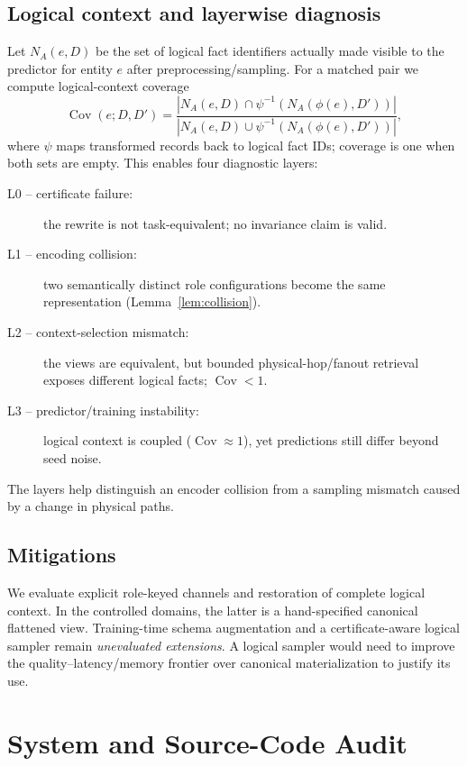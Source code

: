 \documentclass[runningheads]{llncs}
\newcommand{\Cov}{\operatorname{Cov}}
\begin{document}
\subsection{Logical context and layerwise diagnosis}
Let $N_A(e,D)$ be the set of logical fact identifiers actually made visible to the predictor for entity $e$ after preprocessing/sampling. For a matched pair we compute logical-context coverage
\begin{equation}
\Cov(e;D,D')=
\frac{|N_A(e,D)\cap \psi^{-1}(N_A(\phi(e),D'))|}
{|N_A(e,D)\cup \psi^{-1}(N_A(\phi(e),D'))|},
\label{eq:coverage}
\end{equation}
where $\psi$ maps transformed records back to logical fact IDs; coverage is one when both sets are empty. This enables four diagnostic layers:
\begin{description}
    \item[L0 -- certificate failure:] the rewrite is not task-equivalent; no invariance claim is valid.
    \item[L1 -- encoding collision:] two semantically distinct role configurations become the same representation (Lemma~\ref{lem:collision}).
    \item[L2 -- context-selection mismatch:] the views are equivalent, but bounded physical-hop/fanout retrieval exposes different logical facts; $\Cov<1$.
    \item[L3 -- predictor/training instability:] logical context is coupled ($\Cov\approx1$), yet predictions still differ beyond seed noise.
\end{description}
The layers help distinguish an encoder collision from a sampling mismatch caused by a change in physical paths.

\subsection{Mitigations}
We evaluate explicit role-keyed channels and restoration of complete logical context. In the controlled domains, the latter is a hand-specified canonical flattened view. Training-time schema augmentation and a certificate-aware logical sampler remain \emph{unevaluated extensions}. A logical sampler would need to improve the quality--latency/memory frontier over canonical materialization to justify its use.

\section{System and Source-Code Audit}\label{sec:audit}
\end{document}
